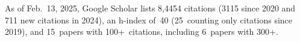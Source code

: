 %
As of Feb.~13, 2025, Google Scholar lists
8,4454 citations (3115 since 2020 and 711 new citations in 2024),
an h-index of~40 (25~counting only citations since 2019),
and 15~papers with 100+~citations, including 6~papers with 300+.
